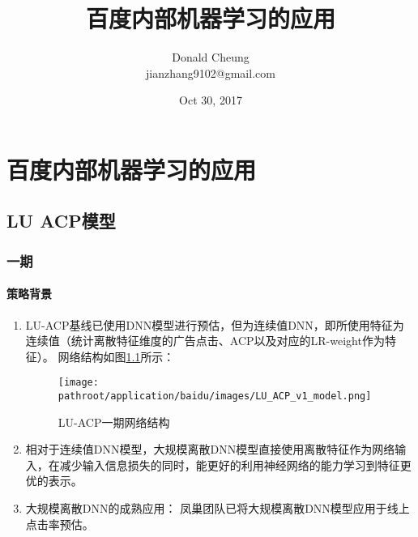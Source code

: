 \documentclass[10pt,a4paper]{ctexbook}
\providecommand{\pathroot}{../..}
\begin{document}
    \setlength{\baselineskip}{20pt}
    \title{百度内部机器学习的应用}
    \author{Donald Cheung\\jianzhang9102@gmail.com}
    \date{Oct 30, 2017}
    \maketitle
    \tableofcontents
\fi

\chapter{百度内部机器学习的应用}

\section{LU ACP模型}
\subsection{一期}
\subsubsection{策略背景}
\begin{enumerate}
\item LU-ACP基线已使用DNN模型进行预估，但为连续值DNN，即所使用特征为连续值（统计离散特征维度的广告点击、ACP以及对应的LR-weight作为特征）。
网络结构如图\ref{fig:lu_acp_v1_model}所示：
\begin{figure}[ht]
    \centering
    \texttt{[image: \\pathroot/application/baidu/images/LU\_ACP\_v1\_model.png]}
    \caption{LU-ACP一期网络结构}
    \label{fig:lu_acp_v1_model}
\end{figure}

\item 相对于连续值DNN模型，大规模离散DNN模型直接使用离散特征作为网络输入，在减少输入信息损失的同时，能更好的利用神经网络的能力学习到特征更优的表示。
\item 大规模离散DNN的成熟应用：
凤巢团队已将大规模离散DNN模型应用于线上点击率预估。
\end{enumerate}
\end{document}
